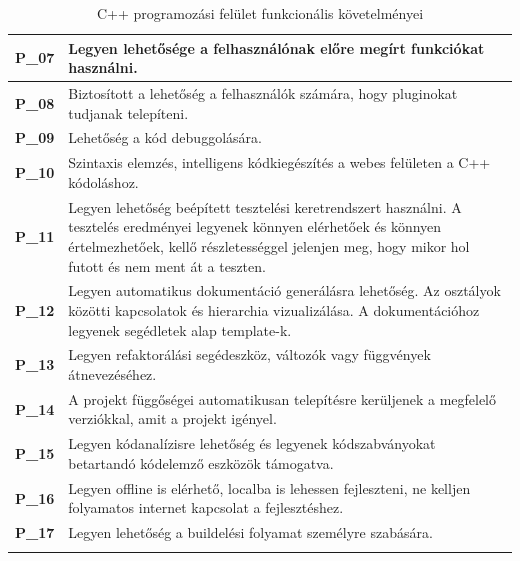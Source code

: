 \documentclass{article}
\begin{document}
\begin{longtable}{|c|p{14cm}|}
       \textbf{P\_07}  &  Legyen lehetősége a felhasználónak előre megírt funkciókat használni. \\\hline
       \textbf{P\_08}  &  Biztosított a lehetőség a felhasználók számára, hogy pluginokat tudjanak telepíteni. \\\hline
       \textbf{P\_09}  &  Lehetőség a kód debuggolására.\\\hline
       \textbf{P\_10}  &  Szintaxis elemzés, intelligens kódkiegészítés a webes felületen a C++ kódoláshoz. \\\hline
       \textbf{P\_11}  &  Legyen lehetőség beépített tesztelési keretrendszert használni. A tesztelés eredményei legyenek könnyen elérhetőek és könnyen értelmezhetőek, kellő részletességgel jelenjen meg, hogy mikor hol futott és nem ment át a teszten.\\\hline
       \textbf{P\_12}  &  Legyen automatikus dokumentáció generálásra lehetőség. Az osztályok közötti kapcsolatok és hierarchia vizualizálása. A dokumentációhoz legyenek segédletek alap template-k. \\\hline
       \textbf{P\_13}  &  Legyen refaktorálási segédeszköz, változók vagy függvények átnevezéséhez. \\\hline
       \textbf{P\_14}  &  A projekt függőségei automatikusan telepítésre kerüljenek a megfelelő verziókkal, amit a projekt igényel. \\\hline
       \textbf{P\_15}  &  Legyen kódanalízisre lehetőség és legyenek kódszabványokat betartandó kódelemző eszközök támogatva. \\\hline
       \textbf{P\_16}  &  Legyen offline is elérhető, localba is lehessen fejleszteni, ne kelljen folyamatos internet kapcsolat a fejlesztéshez.  \\\hline
       \textbf{P\_17}  &  Legyen lehetőség a buildelési folyamat személyre szabására.\\\hline
\hline
\caption{C++ programozási felület funkcionális követelményei}
\end{longtable}
\endgroup
\end{document}
